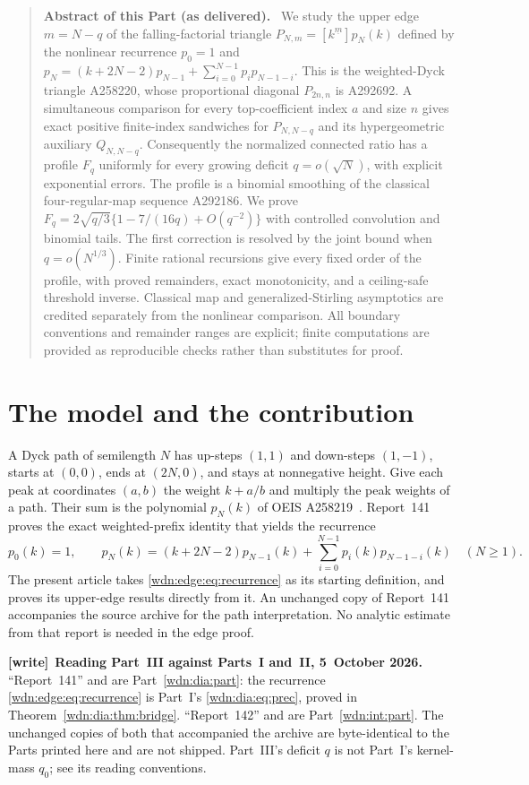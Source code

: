 \documentclass[11pt,letterpaper]{article}
\theoremstyle{remark}\newtheorem{remark}[theorem]{Remark}
\newcommand{\fall}[2]{#1^{\underline{#2}}}
\newenvironment{writenote}[1][]{\par\smallskip\begingroup\small
 \noindent\textbf{[write]}\if\relax\detokenize{#1}\relax\else~\textbf{#1.}\fi\ }%
 {\par\endgroup\smallskip}
\newenvironment{partabstract}{\begin{quote}\small\noindent\textbf{Abstract of this Part (as delivered).}\ }{\end{quote}}
\begin{document}
\begin{partabstract}
We study the upper edge $m=N-q$ of the falling-factorial triangle
$P_{N,m}=[\fall{k}{m}]p_N(k)$ defined by the nonlinear recurrence
$p_0=1$ and
$p_N=(k+2N-2)p_{N-1}+\sum_{i=0}^{N-1}p_ip_{N-1-i}$.
This is the weighted-Dyck triangle A258220, whose proportional diagonal
$P_{2n,n}$ is A292692. A simultaneous comparison for every top-coefficient
index $a$ and size $n$ gives exact positive finite-index sandwiches for
$P_{N,N-q}$ and its hypergeometric auxiliary $Q_{N,N-q}$.
Consequently the normalized connected ratio has a profile $F_q$ uniformly
for every growing deficit $q=o(\sqrt N)$, with explicit exponential errors.
The profile is a binomial smoothing of the classical four-regular-map
sequence A292186. We prove
$F_q=2\sqrt{q/3}\{1-7/(16q)+O(q^{-2})\}$ with controlled convolution
and binomial tails. The first correction is resolved by the joint bound
when $q=o(N^{1/3})$. Finite rational recursions give every fixed order
of the profile, with proved remainders, exact monotonicity, and a
ceiling-safe threshold inverse. Classical map and generalized-Stirling asymptotics
are credited separately from the nonlinear comparison. All boundary
conventions and remainder ranges are explicit; finite computations are
provided as reproducible checks rather than substitutes for proof.
\end{partabstract}
\section{The model and the contribution}
A Dyck path of semilength $N$ has up-steps $(1,1)$ and down-steps $(1,-1)$,
starts at $(0,0)$, ends at $(2N,0)$, and stays at nonnegative height.
Give each peak at coordinates $(a,b)$ the weight $k+a/b$ and multiply
the peak weights of a path. Their sum is the polynomial $p_N(k)$ of
OEIS A258219~\cite{A258219}. Report~141~\cite{foundation} proves the exact
weighted-prefix identity that yields the recurrence
\begin{equation}\label{wdn:edge:eq:recurrence}
 p_0(k)=1,\qquad
 p_N(k)=(k+2N-2)p_{N-1}(k)
       +\sum_{i=0}^{N-1}p_i(k)p_{N-1-i}(k)\quad(N\ge1).
\end{equation}
The present article takes \eqref{wdn:edge:eq:recurrence} as its starting definition,
and proves its upper-edge results directly from it. An unchanged copy of
Report~141 accompanies the source archive for the path interpretation.
No analytic estimate from that report is needed in the edge proof.

\begin{writenote}[Reading Part~III against Parts~I and~II, 5~October 2026]
``Report~141'' and \cite{foundation} are Part~\ref{wdn:dia:part}: the recurrence \eqref{wdn:edge:eq:recurrence} is Part~I's \eqref{wdn:dia:eq:prec}, proved in Theorem~\ref{wdn:dia:thm:bridge}. ``Report~142'' and \cite{interior} are Part~\ref{wdn:int:part}. The unchanged copies of both that accompanied the archive are byte-identical to the Parts printed here and are not shipped. Part~III's deficit $q$ is not Part~I's kernel-mass $q_0$; see its reading conventions.
\end{writenote}
\end{document}
